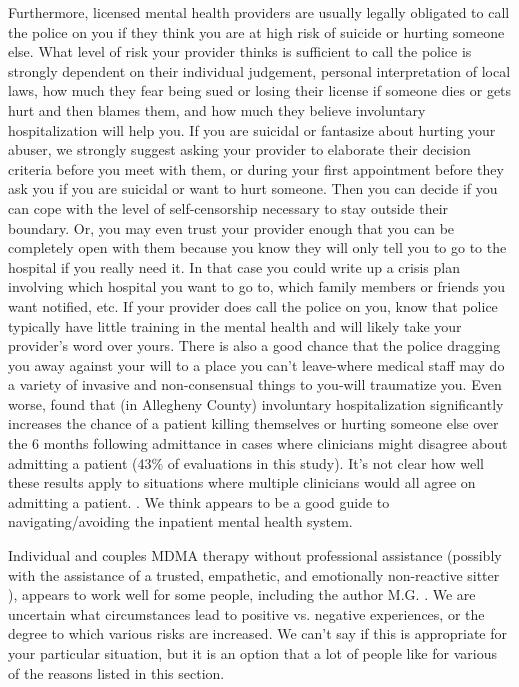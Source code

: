 \documentclass[12pt,letterpaper]{book}
\begin{document}
Furthermore, licensed mental health providers are usually legally obligated to call the police on you if they think you are at high risk of suicide or hurting someone else. What level of risk your provider thinks is sufficient to call the police is strongly dependent on their individual judgement, personal interpretation of local laws, how much they fear being sued or losing their license if someone dies or gets hurt and then blames them, and how much they believe involuntary hospitalization will help you. If you are suicidal or fantasize about hurting your abuser, we strongly suggest asking your provider to elaborate their decision criteria before you meet with them, or during your first appointment before they ask you if you are suicidal or want to hurt someone. Then you can decide if you can cope with the level of self-censorship necessary to stay outside their boundary. Or, you may even trust your provider enough that you can be completely open with them because you know they will only tell you to go to the hospital if you really need it. In that case you could write up a crisis plan involving which hospital you want to go to, which family members or friends you want notified, etc. If your provider does call the police on you, know that police typically have little training in the mental health and will likely take your provider's word over yours. There is also a good chance that the police dragging you away against your will to a place you can't leave-where medical staff may do a variety of invasive and non-consensual things to you-will traumatize you. Even worse, \textcite{emanuelHospitalization} found that (in Allegheny County) involuntary hospitalization significantly increases the chance of a patient killing themselves or hurting someone else over the 6 months following admittance in cases where clinicians might disagree about admitting a patient (43\% of evaluations in this study). It's not clear how well these results apply to situations where multiple clinicians would all agree on admitting a patient. \cite{emanuelHospitalization}. We think \textcite{alexanderInpatient} appears to be a good guide to navigating/avoiding the inpatient mental health system.

Individual and couples MDMA therapy without professional assistance (possibly with the assistance of a trusted, empathetic, and emotionally non-reactive sitter \cite{thalSitter}), appears to work well for some people, including the author M.G. \cite{hillsSolo,colbertEvenings}. We are uncertain what circumstances lead to positive vs. negative experiences, or the degree to which various risks are increased. We can't say if this is appropriate for your particular situation, but it is an option that a lot of people like for various of the reasons listed in this section.
\end{document}
